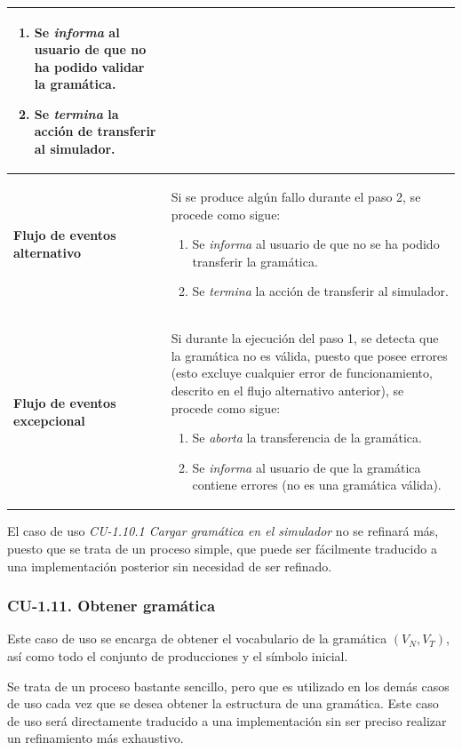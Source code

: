 \begin{longtable}[H]{|>{\columncolor[rgb]{0.63,0.79,0.95}}m{6cm} | m{8.5cm} |}
\begin{enumerate}
     \item Se \textit{informa} al usuario de que no ha podido validar la gramática.
     \item Se \textit{termina} la acción de transferir al si\-mu\-la\-dor.
     \end{enumerate}  \\ \hline              
  \textbf{Flujo de eventos alternativo} & Si se produce algún fallo durante el paso 2, se procede como sigue:
     \begin{enumerate}
     \item Se \textit{informa} al usuario de que no se ha podido transferir la gramática.
     \item Se \textit{termina} la acción de transferir al si\-mu\-la\-dor.
     \end{enumerate}  \\ \hline             
  \textbf{Flujo de eventos excepcional} & Si durante la ejecución del paso 1, se detecta que la gramática no es válida, puesto que posee errores (esto excluye cualquier error de funcionamiento, des\-cri\-to en el flujo alternativo anterior), se procede como sigue: 
     \begin{enumerate}
     \item Se \textit{aborta} la transferencia de la gramática.
     \item Se \textit{informa} al usuario de que la gramática contiene errores (no es una gramática válida).
     \end{enumerate}
   \label{tabla711}
 \end{longtable}

 El caso de uso \textit{CU-1.10.1 Cargar gramática en el simulador} no se refinará más, puesto que se trata de un proceso simple, que puede ser fácilmente traducido a una implementación posterior sin necesidad de ser refinado.

 \subsubsection{CU-1.11. Obtener gramática}

 Este caso de uso se encarga de obtener el vocabulario de la gramática $ (V_{N}, V_{T}) $, así como todo el conjunto de producciones y el símbolo inicial.

 Se trata de un proceso bastante sencillo, pero que es utilizado en los demás casos de uso cada vez que se desea obtener la estructura de una gramática. Este caso de uso será directamente traducido a una implementación sin ser preciso re\-a\-li\-zar un refinamiento más exhaustivo.

